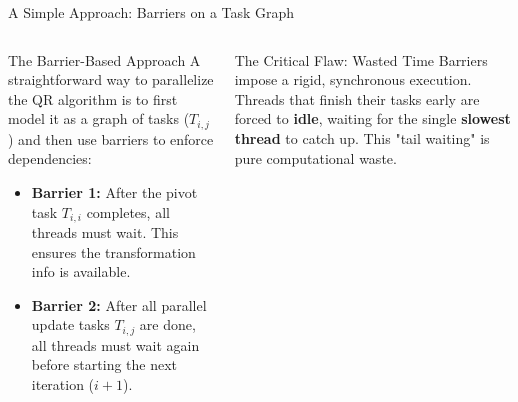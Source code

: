 \begin{frame}{A Simple Approach: Barriers on a Task Graph}
  \begin{columns}[c,onlytextwidth] %

    \begin{block}{The Barrier-Based Approach}
      A straightforward way to parallelize the QR algorithm is to first model it as a graph of tasks ($T_{i,j}$) and then use barriers to enforce dependencies:
      \begin{itemize}
        \item \textbf{Barrier 1:} After the pivot task \textcolor{pivotblue}{$T_{i,i}$} completes, all threads must wait. This ensures the transformation info is available.
        \item \textbf{Barrier 2:} After all parallel update tasks \textcolor{updategreen}{$T_{i,j}$} are done, all threads must wait again before starting the next iteration ($i+1$).
      \end{itemize}
    \end{block}
    


          \begin{alertblock}{The Critical Flaw: Wasted Time}
      Barriers impose a rigid, synchronous execution. Threads that finish their tasks early are forced to \textbf{idle}, waiting for the single \textbf{slowest thread} to catch up. This "tail waiting" is pure computational waste.
    \end{alertblock}
\end{columns}
\end{frame}

